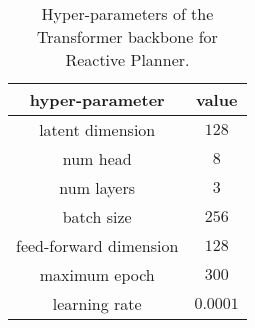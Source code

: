 \begin{table}
    \begin{center}
     \caption{Hyper-parameters of the Transformer backbone for Reactive Planner.}
        \begin{tabular}{cc}
            \toprule
            hyper-parameter & value \\
            \midrule
            latent dimension  & $128$ \\
            num head &$8$ \\
            num layers & $3$ \\
            batch size & $256$ \\
            feed-forward dimension & $128$ \\
            maximum epoch & $300$ \\
            learning rate & $0.0001$ \\
            \bottomrule
        \end{tabular}
    \end{center}
    \label{tab:planner-hyper}
\end{table}